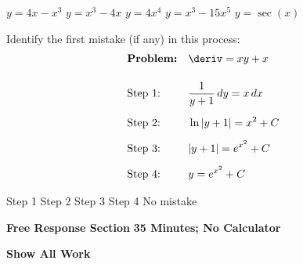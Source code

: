 \begin{questions}
    \begin{oneparchoices}
        \choice $y = 4x - x^3$
        \choice $y = x^3 - 4x$
        \choice $y = 4x^4$
        \choice $y = x^3 - 15x^5$
        \choice $y = \sec (x)$
    \end{oneparchoices} \par \horizontalline

    \question Identify the first mistake (if any) in this process: \begin{align*}
        & \textbf{Problem:} && \deriv = xy + x\\[11pt]
        & \text{Step 1:} && \dfrac{1}{y + 1} \, dy = x \, dx \\[5.5pt]
        & \text{Step 2:} && \ln |y + 1| = x^2 + C \\[5.5pt]
        & \text{Step 3:} && |y + 1| = e^{x^2} + C \\[5.5pt]
        & \text{Step 4:} && y = e^{x^2} + C
    \end{align*}

    \begin{oneparchoices}
        \choice Step 1
        \choice Step 2
        \choice Step 3
        \choice Step 4
        \choice No mistake
    \end{oneparchoices} \par \horizontalline
\end{questions}

\newpage
{}

\textbf{Free Response Section} \hfill \textbf{35 Minutes; No Calculator} \\[11pt]

\begin{center}
    \textbf{Show All Work}
\end{center}
\vspace{11pt}

